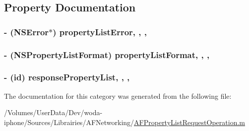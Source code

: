 \subsection{Property Documentation}
\hypertarget{category_a_f_property_list_request_operation_07_08_a8a5b1afc8ac2ac7214d3e5c671339d13}{
\subsubsection[{property\-List\-Error}]{\setlength{\rightskip}{0pt plus 5cm}-\/ (N\-S\-Error$\ast$) property\-List\-Error\hspace{0.3cm}{\ttfamily [read]}, {\ttfamily [write]}, {\ttfamily [nonatomic]}, {\ttfamily [assign]}}}\label{category_a_f_property_list_request_operation_07_08_a8a5b1afc8ac2ac7214d3e5c671339d13}
\hypertarget{category_a_f_property_list_request_operation_07_08_a4c1875d3d50ae35f4e95074e83fcbfcc}{
\subsubsection[{property\-List\-Format}]{\setlength{\rightskip}{0pt plus 5cm}-\/ (N\-S\-Property\-List\-Format) property\-List\-Format\hspace{0.3cm}{\ttfamily [read]}, {\ttfamily [write]}, {\ttfamily [nonatomic]}, {\ttfamily [assign]}}}\label{category_a_f_property_list_request_operation_07_08_a4c1875d3d50ae35f4e95074e83fcbfcc}
\hypertarget{category_a_f_property_list_request_operation_07_08_a49f4f05444c9c574df1862cb90af5a31}{
\subsubsection[{response\-Property\-List}]{\setlength{\rightskip}{0pt plus 5cm}-\/ (id) response\-Property\-List\hspace{0.3cm}{\ttfamily [read]}, {\ttfamily [write]}, {\ttfamily [nonatomic]}, {\ttfamily [assign]}}}\label{category_a_f_property_list_request_operation_07_08_a49f4f05444c9c574df1862cb90af5a31}


The documentation for this category was generated from the following file\-:\begin{DoxyCompactItemize}
\item 
/\-Volumes/\-User\-Data/\-Dev/woda-\/iphone/\-Sources/\-Librairies/\-A\-F\-Networking/\hyperlink{_a_f_property_list_request_operation_8m}{A\-F\-Property\-List\-Request\-Operation.\-m}\end{DoxyCompactItemize}
